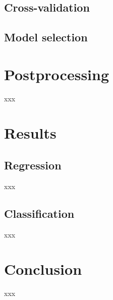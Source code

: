 \documentclass[letterpaper, 10 pt, conference, onecolumn]{ieeeconf}  %
\begin{document}

\subsection{Cross-validation}



\subsection{Model selection}



\section{Postprocessing}\label{sec:postprocess}
xxx



\section{Results}\label{sec:results}
\subsection{Regression}
xxx

\subsection{Classification}
xxx



\section{Conclusion}\label{sec:conclusion}
xxx

\newpage



\end{document}
